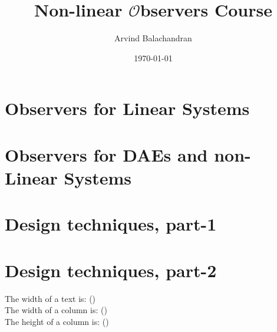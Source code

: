 \documentclass[a4paper]{book}
\title{\Large Non-linear $\mathcal{O}$bservers Course}
\author{Arvind Balachandran}
\date{\today}
\begin{document}
\maketitle
{}
\newpage
{}

\chapter{Observers for Linear Systems}

\clearpage
 
\clearpage

\clearpage

\clearpage

\clearpage

\clearpage




\clearpage

\clearpage

\clearpage

\clearpage

\clearpage

\chapter{Observers for DAEs and non-Linear Systems}

\clearpage 

\clearpage

\clearpage

\clearpage

\clearpage

\clearpage


\chapter{Design techniques, part-1}


\chapter{Design techniques, part-2}

\clearpage



\newpage
The width of a text is:
\prntlen{\textwidth} (\prntlen{\textwidth}) \\
The width of a column is:
\prntlen{\columnwidth} (\prntlen{\columnwidth}) \\
The height of a column is:
\prntlen{\textheight} (\prntlen{\textheight}) \\ 
\end{document}
